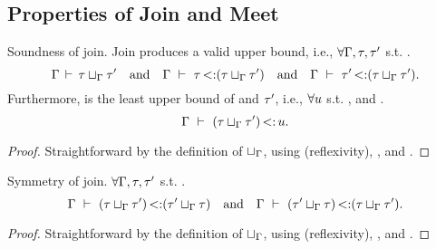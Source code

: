 \subsection{Properties of Join and Meet}%
\label{subsec:props-join-meet-proof}

\begin{theorem}{Soundness of join.}%
\label{thm:join-sound}
    Join produces a valid upper bound, i.e., 
    $\forall \Gamma, \tau, \tau'$ s.t. .
    \[
        \Gamma\,\vdash\,\tau \sqcup_{\Gamma} \tau'
        \quad\text{and}\quad
        \Gamma\ \vdash\ \tau \operatorname{<:} (\tau \sqcup_{\Gamma} \tau')
        \quad\text{and}\quad
        \Gamma\ \vdash\ \tau' \operatorname{<:} (\tau \sqcup_{\Gamma} \tau').
    \]
    Furthermore,  is the least upper bound
    of \ty and $\tau'$, i.e.,
    $\forall u$ s.t. \tyvlddflt{\tyub},
    \subtydflt{\ty}{\tyub} and .
    \[
        \Gamma\ \vdash\ (\tau \sqcup_{\Gamma} \tau') \operatorname{<:} u.
    \]
\end{theorem}
\begin{proof}
    Straightforward by the definition of $\sqcup_{\Gamma}$,
    using  (reflexivity), 
    , and .
\end{proof}

\begin{lemma}{Symmetry of join.}
    $\forall \Gamma, \tau, \tau'$ s.t. .
    \[
        \Gamma\ \vdash\ (\tau \sqcup_{\Gamma} \tau') \operatorname{<:} (\tau' \sqcup_{\Gamma} \tau)
        \quad\text{and}\quad
        \Gamma\ \vdash\ (\tau' \sqcup_{\Gamma} \tau) \operatorname{<:} (\tau \sqcup_{\Gamma} \tau').
    \]
\end{lemma}
\begin{proof}
    Straightforward by the definition of $\sqcup_{\Gamma}$,
    using  (reflexivity), 
    , and .
\end{proof}

